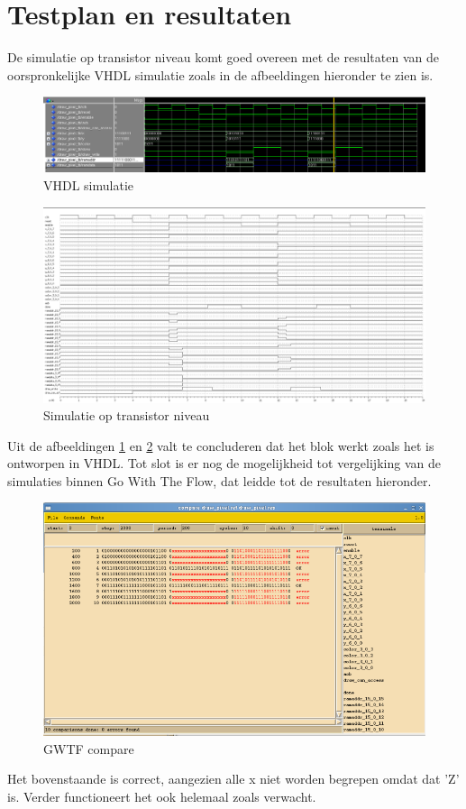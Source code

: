 \documentclass{scrreprt} %
\begin{document}
\section{Testplan en resultaten}
 De simulatie op transistor niveau komt goed overeen met de resultaten van de oorspronkelijke VHDL simulatie zoals in de afbeeldingen hieronder te zien is.
\begin{figure} [h!]
\includegraphics [width = \textwidth] {inputfiles/dp_sim}
\caption{VHDL simulatie}
\label{fig:dpsim}
\end{figure}

\begin{figure} [h!]
\includegraphics [width = \textwidth] {inputfiles/dp_sw_lev}
\caption{Simulatie op transistor niveau}
\label{fig:dpswitchl}
\end{figure}
Uit de afbeeldingen \ref{fig:dpsim} en \ref{fig:dpswitchl} valt te concluderen dat het blok werkt zoals het is ontworpen in VHDL. Tot slot is er nog de mogelijkheid tot vergelijking van de simulaties binnen Go With The Flow, dat leidde tot de resultaten hieronder.
\begin{figure} [h!]
\includegraphics [width = \textwidth] {inputfiles/dp_comp}
\caption{GWTF compare}
\label{fig:dpcomp}
\end{figure}
Het bovenstaande is correct, aangezien alle x niet worden begrepen omdat dat 'Z' is. Verder functioneert het ook helemaal zoals verwacht.
\end{document}
